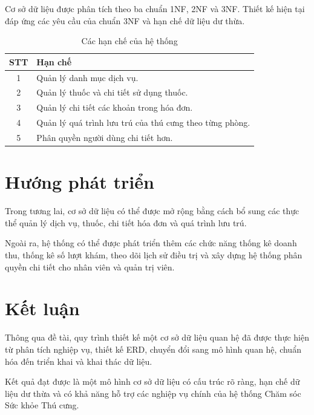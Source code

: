 Cơ sở dữ liệu được phân tích theo ba chuẩn 1NF, 2NF và 3NF. Thiết kế hiện tại đáp ứng các yêu cầu của chuẩn 3NF và hạn chế dữ liệu dư thừa.


\begin{table}[htbp]
    \centering
    \caption{Các hạn chế của hệ thống}
    \label{tab:limitations}
    \begin{tabular}{|c|l|}
        \hline
        \textbf{STT} & \textbf{Hạn chế} \\ \hline
        1 & Quản lý danh mục dịch vụ. \\ \hline
        2 & Quản lý thuốc và chi tiết sử dụng thuốc. \\ \hline
        3 & Quản lý chi tiết các khoản trong hóa đơn. \\ \hline
        4 & Quản lý quá trình lưu trú của thú cưng theo từng phòng. \\ \hline
        5 & Phân quyền người dùng chi tiết hơn. \\ \hline
    \end{tabular}
\end{table}

\section{Hướng phát triển}

Trong tương lai, cơ sở dữ liệu có thể được mở rộng bằng cách bổ sung các thực thể quản lý dịch vụ, thuốc, chi tiết hóa đơn và quá trình lưu trú.

Ngoài ra, hệ thống có thể được phát triển thêm các chức năng thống kê doanh thu, thống kê số lượt khám, theo dõi lịch sử điều trị và xây dựng hệ thống phân quyền chi tiết cho nhân viên và quản trị viên.

\section{Kết luận}

Thông qua đề tài, quy trình thiết kế một cơ sở dữ liệu quan hệ đã được thực hiện từ phân tích nghiệp vụ, thiết kế ERD, chuyển đổi sang mô hình quan hệ, chuẩn hóa đến triển khai và khai thác dữ liệu.

Kết quả đạt được là một mô hình cơ sở dữ liệu có cấu trúc rõ ràng, hạn chế dữ liệu dư thừa và có khả năng hỗ trợ các nghiệp vụ chính của hệ thống Chăm sóc Sức khỏe Thú cưng.